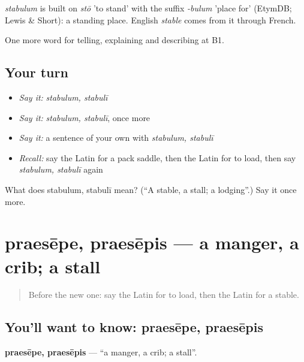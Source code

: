 \begin{cousinweb}
\emph{stabulum} is built on \emph{stō} 'to stand' with the suffix \emph{-bulum} 'place for' (EtymDB; Lewis \& Short): a standing place. English \emph{stable} comes from it through French.
\end{cousinweb}

\begin{grammarlens}[title={What you've built}]
One more word for telling, explaining and describing at B1.
\end{grammarlens}

\subsection*{Your turn}
\begin{itemize}
\raggedright
  \item \emph{Say it:} \emph{stabulum, stabulī}
  \item \emph{Say it:} \emph{stabulum, stabulī}, once more
  \item \emph{Say it:} a sentence of your own with \emph{stabulum, stabulī}
  \item \emph{Recall:} say the Latin for a pack saddle, then the Latin for to load, then say \emph{stabulum, stabulī} again
\end{itemize}

\begin{tcolorbox}[breakable,colback=teal!4,colframe=teal!35!black,title={Before you move on}]
What does stabulum, stabulī mean? (\textquotedblleft{}A stable, a stall; a lodging\textquotedblright{}.) Say it once more.
\end{tcolorbox}
\section[praesēpe, praesēpis]{praesēpe, praesēpis — a manger, a crib; a stall}

\label{lesson:LA-C434-praesepe}



\begin{quote}
Before the new one: say the Latin for to load, then the Latin for a stable.
\end{quote}

\subsection*{You'll want to know: praesēpe, praesēpis}
\textbf{praesēpe, praesēpis} — \textquotedblleft{}a manger, a crib; a stall\textquotedblright{}.


